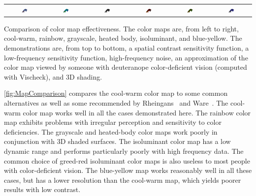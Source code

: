 \documentclass{llncs}
\newcommand{\scite}[1]{~\cite{#1}}
\begin{document}
\begin{plate*}
\begin{tabular}{c@{\,}c@{\,}c@{\,}c@{\,}c@{\,}c}
    \includegraphics[width=0.16\textwidth]{images/Cool2WarmShading} &
    \includegraphics[width=0.16\textwidth]{images/RainbowShading} &
    \includegraphics[width=0.16\textwidth]{images/GrayscaleShading} &
    \includegraphics[width=0.16\textwidth]{images/BlackBodyShading} &
    \includegraphics[width=0.16\textwidth]{images/Green2RedShading} &
    \includegraphics[width=0.16\textwidth]{images/Blue2YellowShading}
  \end{tabular}
  \caption{Comparison of color map effectiveness.  The color maps are, from
    left to right, cool-warm, rainbow, grayscale, heated body, isoluminant,
    and blue-yellow.  The demonstrations are, from top to bottom, a spatial
    contrast sensitivity function, a low-frequency sensitivity function,
    high-frequency noise, an approximation of the color map viewed by
    someone with deuteranope color-deficient vision (computed with
    Vischeck), and 3D shading.}
  \label{fig:MapComparison}
\end{plate*}

\autoref{fig:MapComparison} compares the cool-warm color map to some
common alternatives as well as some recommended by
Rheingans\scite{Rheingans99} and Ware\scite{Ware04}.  The cool-warm color
map works well in all the cases demonstrated here.  The rainbow color map
exhibits problems with irregular perception and sensitivity to color
deficiencies.  The grayscale and heated-body color maps work poorly in
conjunction with 3D shaded surfaces.  The isoluminant color map has a low
dynamic range and performs particularly poorly with high frequency data.
The common choice of greed-red isoluminant color maps is also useless to
most people with color-deficient vision.  The blue-yellow map works
reasonably well in all these cases, but has a lower resolution than the
cool-warm map, which yields poorer results with low contrast.
\end{document}
